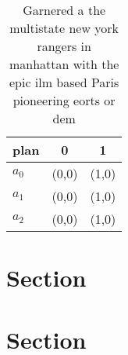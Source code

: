 \documentclass[a4paper]{article}
\begin{document}
\begin{table}
\begin{adjustbox}{width=0.8\columnwidth}
\begin{tabular}{|l|l|l|}
\hline
\textbf{plan} & \multicolumn{1}{c|}{\textbf{0}} & \multicolumn{1}{c|}{\textbf{1}} \\ \hline
\textbf{$a_0$}  & (0,0) & (1,0) \\ \hline
\textbf{$a_1$}  & (0,0) & (1,0) \\ \hline
\textbf{$a_2$}  & (0,0) & (1,0) \\ \hline
\end{tabular}
\end{adjustbox}
\caption{Garnered a the multistate new york rangers in manhattan with the epic ilm based Paris pioneering eorts or dem
}
\end{table}

\section{Section}

\section{Section}
\end{document}
